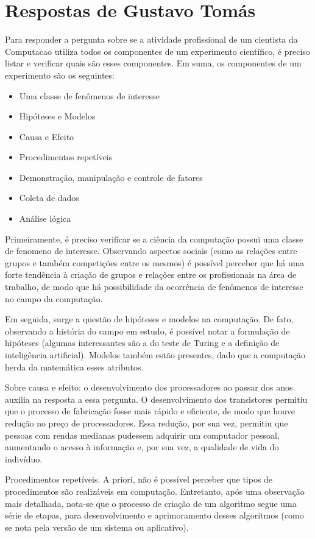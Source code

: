 \section{Respostas de Gustavo Tomás}

Para responder a pergunta sobre se a atividade profissional de um cientista da \gls{Computacao} utiliza todos os componentes de um experimento científico, é preciso listar e verificar quais são esses componentes. Em suma, os componentes de um experimento são os seguintes: 

\begin{itemize}
    \item Uma classe de fenômenos de interesse
    \item Hipóteses e Modelos
    \item Causa e Efeito
    \item Procedimentos repetíveis
    \item Demonstração, manipulação e controle de fatores
    \item Coleta de dados
    \item Análise lógica
\end{itemize}

Primeiramente, é preciso verificar se a ciência da computação possui uma classe de \gls{fenomeno} de interesse. Observando aspectos sociais (como as relações entre grupos e também competições entre os mesmos) é possível perceber que há uma forte tendência à criação de grupos e relações entre os profissionais na área de trabalho, de modo que há possibilidade da ocorrência de fenômenos de interesse no campo da computação.

Em seguida, surge a questão de hipóteses e modelos na computação. De fato, observando a história do campo em estudo, é possível notar a formulação de hipóteses (algumas interessantes são a do teste de Turing e a definição de inteligência artificial). Modelos também estão presentes, dado que a computação herda da matemática esses atributos.

Sobre causa e efeito: o desenvolvimento dos processadores ao passar dos anos auxilia na resposta a essa pergunta. O desenvolvimento dos transistores permitiu que o processo de fabricação fosse mais rápido e eficiente, de modo que houve redução no preço de processadores. Essa redução, por sua vez, permitiu que pessoas com rendas medianas pudessem adquirir um computador pessoal, aumentando o acesso à informação e, por sua vez, a qualidade de vida do indivíduo.

Procedimentos repetíveis. A priori, não é possível perceber que tipos de procedimentos são realizáveis em computação. Entretanto, após uma observação mais detalhada, nota-se que o processo de criação de um algoritmo segue uma série de etapas, para desenvolvimento e aprimoramento desses algoritmos (como se nota pela versão de um sistema ou aplicativo).

